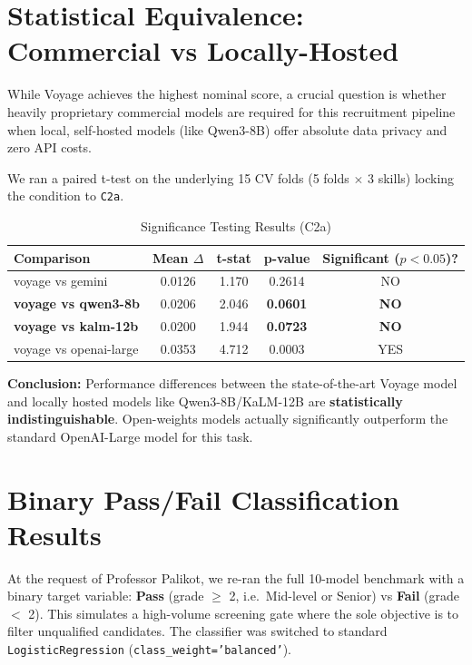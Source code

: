 \documentclass[11pt]{article}
\begin{document}
\section{Statistical Equivalence: Commercial vs Locally-Hosted}

While Voyage achieves the highest nominal score, a crucial question is whether heavily proprietary commercial models are required for this recruitment pipeline when local, self-hosted models (like Qwen3-8B) offer absolute data privacy and zero API costs.

We ran a paired t-test on the underlying 15 CV folds (5 folds $\times$ 3 skills) locking the condition to \texttt{C2a}.

\begin{table}[htbp]
\centering
\caption{Significance Testing Results (C2a)}
\begin{tabular}{lcccc}
\toprule
\textbf{Comparison} & \textbf{Mean $\Delta$} & \textbf{t-stat} & \textbf{p-value} & \textbf{Significant ($p<0.05$)?} \\
\midrule
voyage vs gemini & 0.0126 & 1.170 & 0.2614 & NO \\
\textbf{voyage vs qwen3-8b} & 0.0206 & 2.046 & \textbf{0.0601} & \textbf{NO} \\
\textbf{voyage vs kalm-12b} & 0.0200 & 1.944 & \textbf{0.0723} & \textbf{NO} \\
voyage vs openai-large & 0.0353 & 4.712 & 0.0003 & YES \\
\bottomrule
\end{tabular}
\end{table}

\textbf{Conclusion:} Performance differences between the state-of-the-art Voyage model and locally hosted models like Qwen3-8B/KaLM-12B are \textbf{statistically indistinguishable}. Open-weights models actually significantly outperform the standard OpenAI-Large model for this task. 

\section{Binary Pass/Fail Classification Results}

At the request of Professor Palikot, we re-ran the full 10-model benchmark with a binary target variable: \textbf{Pass} (grade $\geq$ 2, i.e.\ Mid-level or Senior) vs \textbf{Fail} (grade $<$ 2). This simulates a high-volume screening gate where the sole objective is to filter unqualified candidates. The classifier was switched to standard \texttt{LogisticRegression} (\texttt{class\_weight='balanced'}).
\end{document}
